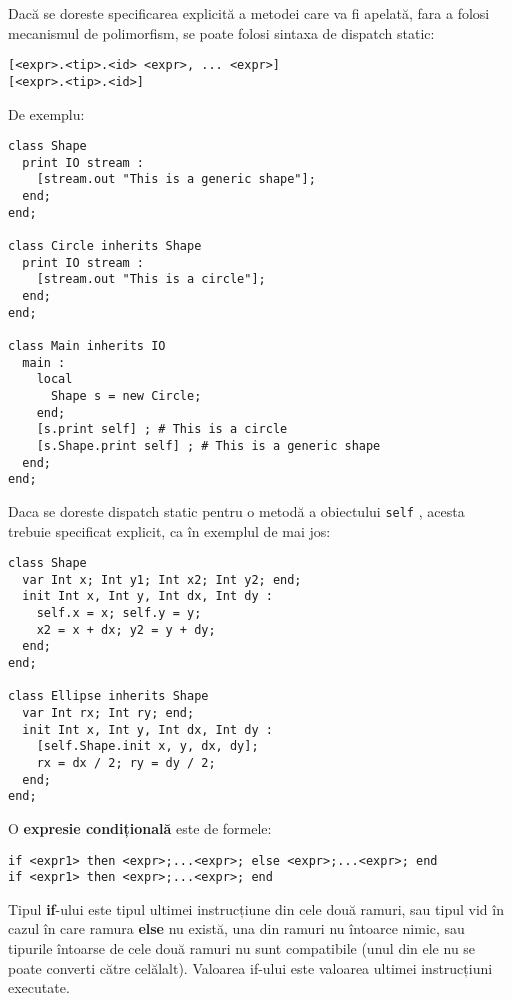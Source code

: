 \documentclass[12pt]{article}
\begin{document}
Dacă se doreste specificarea explicită a metodei care va fi apelată, fara a folosi mecanismul de polimorfism, se poate folosi sintaxa de dispatch static:

\begin{verbatim}
[<expr>.<tip>.<id> <expr>, ... <expr>]
[<expr>.<tip>.<id>]
\end{verbatim}

De exemplu:

\begin{verbatim}
class Shape
  print IO stream :
    [stream.out "This is a generic shape"];
  end;
end;

class Circle inherits Shape
  print IO stream :
    [stream.out "This is a circle"];
  end;
end;

class Main inherits IO
  main :
    local
      Shape s = new Circle;
    end;
    [s.print self] ; # This is a circle
    [s.Shape.print self] ; # This is a generic shape
  end;
end;

\end{verbatim}


Daca se doreste dispatch static pentru o metodă a obiectului \texttt{self} , acesta trebuie specificat explicit, ca în exemplul de mai jos:

\begin{verbatim}
class Shape
  var Int x; Int y1; Int x2; Int y2; end;
  init Int x, Int y, Int dx, Int dy :
    self.x = x; self.y = y;
    x2 = x + dx; y2 = y + dy;
  end;
end;

class Ellipse inherits Shape
  var Int rx; Int ry; end;
  init Int x, Int y, Int dx, Int dy :
    [self.Shape.init x, y, dx, dy];
    rx = dx / 2; ry = dy / 2;
  end;
end;
\end{verbatim}


O \textbf{expresie condițională} este de formele:

\begin{verbatim}
if <expr1> then <expr>;...<expr>; else <expr>;...<expr>; end
if <expr1> then <expr>;...<expr>; end
\end{verbatim}

Tipul \textbf{if}-ului este tipul ultimei instrucțiune din cele două ramuri, sau tipul vid în cazul în care ramura \textbf{else} nu există, una din ramuri nu întoarce nimic, sau tipurile întoarse de cele două ramuri nu sunt compatibile (unul din ele nu se poate converti către celălalt). Valoarea if-ului este valoarea ultimei instrucțiuni executate.
\end{document}
